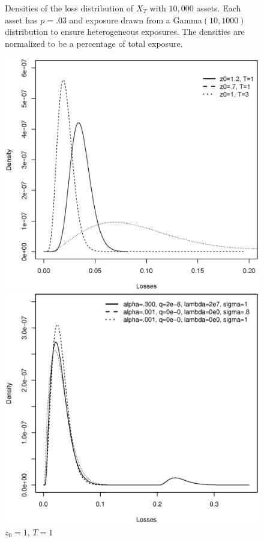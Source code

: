 \documentclass[12pt]{article}
\theoremstyle{definition}
\begin{document}
\begin{figure}[htb]
\begin{framed}
Densities of the loss distribution of \(X_T\) with \(10,000\) assets.  Each asset has \(p=.03\) and exposure drawn from a Gamma\((10, 1000)\) distribution to ensure heterogeneous exposures. The densities are normalized to be a percentage of total exposure. \newline
\begin{minipage}[t]{.48\textwidth}
\centering
\includegraphics[width=1\textwidth]{Fig1}
\caption{\(\alpha=.3\), \(\sigma=.5\), \(\lambda=0\), \(q=0\).  \label{fig5}}
\end{minipage}\hfill
\begin{minipage}[t]{.48\textwidth}
\centering
\includegraphics[width=1\textwidth]{Fig2}
\caption{\(z_0=1\), \(T=1\)  \label{fig6}}
\end{minipage}\hfill
\end{framed}
\end{figure}
\end{document}
